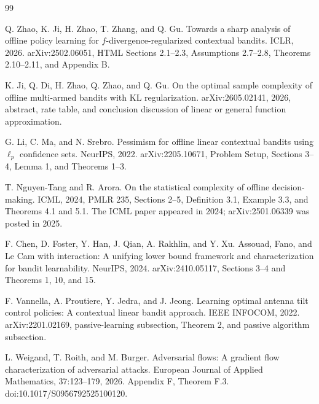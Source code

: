 \documentclass{article}
\begin{document}
\begin{thebibliography}{99}

   Q. Zhao, K. Ji, H. Zhao, T. Zhang, and Q. Gu. Towards a sharp analysis of offline policy learning for \(f\)-divergence-regularized contextual bandits. ICLR, 2026. arXiv:2502.06051, HTML Sections 2.1--2.3, Assumptions 2.7--2.8, Theorems 2.10--2.11, and Appendix B.

   K. Ji, Q. Di, H. Zhao, Q. Zhao, and Q. Gu. On the optimal sample complexity of offline multi-armed bandits with KL regularization. arXiv:2605.02141, 2026, abstract, rate table, and conclusion discussion of linear or general function approximation.

   G. Li, C. Ma, and N. Srebro. Pessimism for offline linear contextual bandits using \(\ell_p\) confidence sets. NeurIPS, 2022. arXiv:2205.10671, Problem Setup, Sections 3--4, Lemma 1, and Theorems 1--3.

   T. Nguyen-Tang and R. Arora. On the statistical complexity of offline decision-making. ICML, 2024, PMLR 235, Sections 2--5, Definition 3.1, Example 3.3, and Theorems 4.1 and 5.1. The ICML paper appeared in 2024; arXiv:2501.06339 was posted in 2025.

   F. Chen, D. Foster, Y. Han, J. Qian, A. Rakhlin, and Y. Xu. Assouad, Fano, and Le Cam with interaction: A unifying lower bound framework and characterization for bandit learnability. NeurIPS, 2024. arXiv:2410.05117, Sections 3--4 and Theorems 1, 10, and 15.

   F. Vannella, A. Proutiere, Y. Jedra, and J. Jeong. Learning optimal antenna tilt control policies: A contextual linear bandit approach. IEEE INFOCOM, 2022. arXiv:2201.02169, passive-learning subsection, Theorem 2, and passive algorithm subsection.

   L. Weigand, T. Roith, and M. Burger. Adversarial flows: A gradient flow characterization of adversarial attacks. European Journal of Applied Mathematics, 37:123--179, 2026. Appendix F, Theorem F.3. doi:10.1017/S0956792525100120.

\end{thebibliography}
\end{document}
